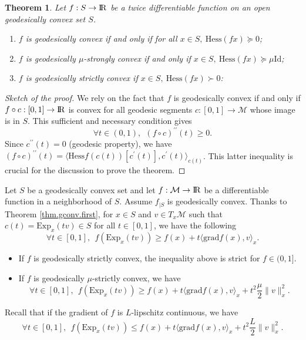 \documentclass[10pt,a4paper]{book}
\theoremstyle{definition}
\theoremstyle{plain}
\newtheorem{thm}{Theorem}[section]
\theoremstyle{remark}
\newcommand{\grad}{\textrm{grad}}
\newcommand \M {\mathcal{M}}
\def\R{{\rm I\kern-0.16em R}}
\begin{document}
\begin{thm}
Let $f:S\to \R$ be a twice differentiable function on an open geodesically convex set $S$. 
\begin{enumerate}
\item $f$ is geodesically convex if and only if for all $x\in S,~\text{Hess}(fx)\succeq 0$;
\item $f$ is geodesically $\mu$-strongly convex if and only if $x\in S,~\text{Hess}(fx)\succeq \mu \text{Id}$;
\item $f$ is geodesically strictly convex if $x\in S,~\text{Hess}(fx)\succ0$:
\end{enumerate}
\end{thm}
\begin{proof}[Sketch of the proof]
We rely on the fact that $f$ is geodesically convex if and only if $f\circ c:[0,1]\to \R$ is convex for all geodesic segments $c:[0,1]\to \M$ whose image is in $S$. This sufficient and necessary condition gives
$$\forall t \in (0,1),~~(f\circ c)^{\prime \prime}(t)\ge 0.$$
Since $c^{\prime \prime}(t)=0$ (geodesic property), we have $(f\circ c)^{\prime \prime}(t)=\langle \text{Hess} f(c(t))[c^{\prime}(t)],c^{\prime}(t)\rangle_{c(t)}$. This latter inequality is crucial for the discussion to prove the theorem.
\end{proof}
\par \medskip
Let $S$ be a geodesically convex set and let $f:\M\to \R$ be a differentiable function in a neighborhood of $S$. Assume $f_{\mid S}$ is geodesically convex. Thanks to Theorem \ref{thm.gconv.first}, for $x\in S$ and $v\in T_x\M$ such that $c(t)=\text{Exp}_x(tv) \in S$ for all $t\in [0,1]$, we have the following 
$$\forall t\in [0,1],~~f(\text{Exp}_x(tv))\ge f(x)+t\langle \grad f(x),v\rangle_x.$$
\begin{itemize}
\item If $f$ is geodesically strictly convex, the inequality above is strict for $f\in (0,1]$. 
\item If $f$ is geodesically $\mu$-strictly convex, we have 
\begin{equation}\label{eq.gmuconv}
\forall t \in [0,1],~~f(\text{Exp}_x(tv))\ge f(x)+t\langle \grad f(x),v\rangle_x+t^2\frac{\mu}{2}\|v\|_x^2.
\end{equation}
\end{itemize}
Recall that if the gradient of $f$ is $L$-lipschitz continuous, we have
\begin{equation}
\label{eq.gradLcont}
\forall t\in [0,1],~~f(\text{Exp}_x(tv))\leq f(x)+t\langle \grad f(x),v\rangle_x+t^2\frac{L}{2}\|v\|_x^2.\end{equation}
\end{document}
